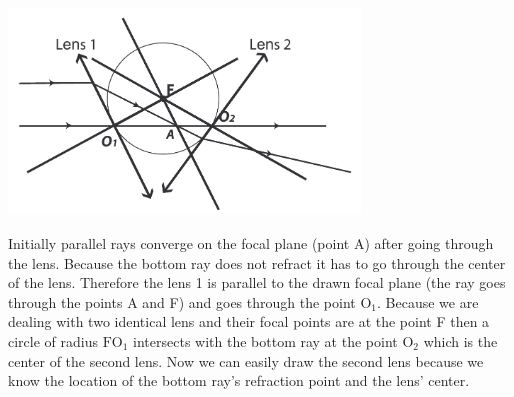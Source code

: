 \documentclass[11pt]{article}
\begin{document}

\solueng
\begin{center}
\includegraphics[width=0.7\textwidth]{2014-lahg-07-optilineskeemlahendus_ing}
\end{center}
Initially parallel rays converge on the focal plane (point A) after going through the lens. Because the bottom ray does not refract it has to go through the center of the lens. Therefore the lens 1 is parallel to the drawn focal plane (the ray goes through the points A and F) and goes through the point $\text{O}_1$. Because we are dealing with two identical lens and their focal points are at the point F then a circle of radius $\text{FO}_1$ intersects with the bottom ray at the point $\text{O}_2$ which is the center of the second lens. Now we can easily draw the second lens because we know the location of the bottom ray’s refraction point and the lens’ center.
\probend
\bigskip

\end{document}
